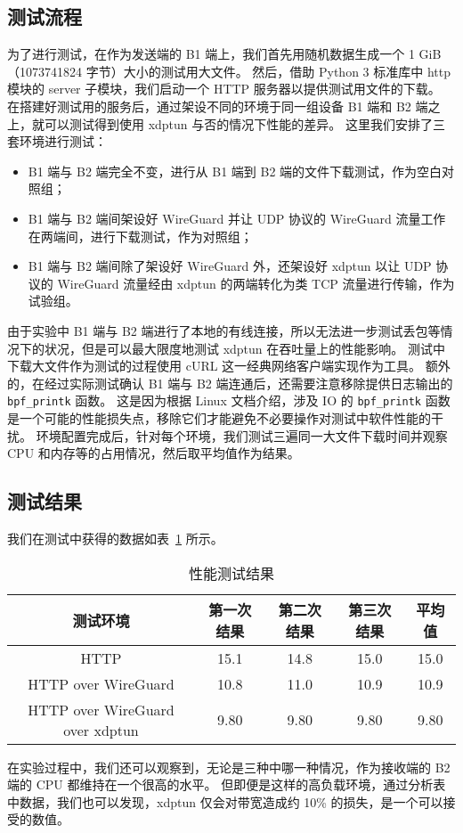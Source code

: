 \subsection{测试流程}

为了进行测试，在作为发送端的 B1 端上，我们首先用随机数据生成一个 1 GiB（1073741824 字节）大小的测试用大文件。
然后，借助 Python 3 标准库中 http 模块的 server 子模块，我们启动一个 HTTP 服务器以提供测试用文件的下载。
在搭建好测试用的服务后，通过架设不同的环境于同一组设备 B1 端和 B2 端之上，就可以测试得到使用 xdptun 与否的情况下性能的差异。
这里我们安排了三套环境进行测试：

\begin{itemize}
  \item B1 端与 B2 端完全不变，进行从 B1 端到 B2 端的文件下载测试，作为空白对照组；
  \item B1 端与 B2 端间架设好 WireGuard 并让 UDP 协议的 WireGuard 流量工作在两端间，进行下载测试，作为对照组；
  \item B1 端与 B2 端间除了架设好 WireGuard 外，还架设好 xdptun 以让 UDP 协议的 WireGuard 流量经由 xdptun 的两端转化为类 TCP 流量进行传输，作为试验组。
\end{itemize}

由于实验中 B1 端与 B2 端进行了本地的有线连接，所以无法进一步测试丢包等情况下的状况，但是可以最大限度地测试 xdptun 在吞吐量上的性能影响。
测试中下载大文件作为测试的过程使用 cURL 这一经典网络客户端实现作为工具。
额外的，在经过实际测试确认 B1 端与 B2 端连通后，还需要注意移除提供日志输出的 \texttt{bpf\_printk} 函数。
这是因为根据 Linux 文档介绍，涉及 IO 的 \texttt{bpf\_printk} 函数是一个可能的性能损失点，移除它们才能避免不必要操作对测试中软件性能的干扰。
环境配置完成后，针对每个环境，我们测试三遍同一大文件下载时间并观察 CPU 和内存等的占用情况，然后取平均值作为结果。

\subsection{测试结果}

我们在测试中获得的数据如表~\ref{tab:perf-test} 所示。

\begin{table}[h]
  \centering
  \caption{性能测试结果}
  \label{tab:perf-test}
  \begin{tabular}{c c c c c}
    \toprule
    测试环境 & 第一次结果 & 第二次结果 & 第三次结果 & 平均值 \\
    \midrule
    HTTP & 15.1 & 14.8 & 15.0 & 15.0 \\
    HTTP over WireGuard & 10.8 & 11.0 & 10.9 & 10.9 \\
    HTTP over WireGuard over xdptun & 9.80 & 9.80 & 9.80 & 9.80 \\
    \bottomrule
  \end{tabular}
\end{table}

在实验过程中，我们还可以观察到，无论是三种中哪一种情况，作为接收端的 B2 端的 CPU 都维持在一个很高的水平。
但即便是这样的高负载环境，通过分析表中数据，我们也可以发现，xdptun 仅会对带宽造成约 10\% 的损失，是一个可以接受的数值。
